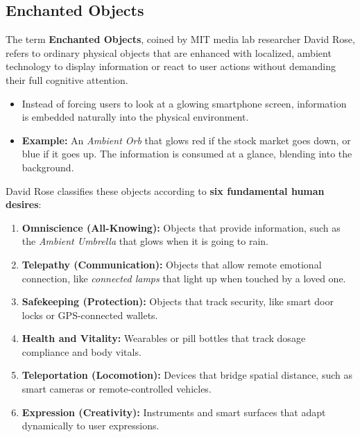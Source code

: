 \documentclass[12pt,a4paper]{article}
\begin{document}
\subsection{Enchanted Objects}
The term \textbf{Enchanted Objects}, coined by MIT media lab researcher David Rose, refers to ordinary physical objects that are enhanced with localized, ambient technology to display information or react to user actions without demanding their full cognitive attention.
\begin{itemize}[leftmargin=*, itemsep=2pt]
  \item Instead of forcing users to look at a glowing smartphone screen, information is embedded naturally into the physical environment.
  \item \textbf{Example:} An \textit{Ambient Orb} that glows red if the stock market goes down, or blue if it goes up. The information is consumed at a glance, blending into the background.
\end{itemize}

David Rose classifies these objects according to \textbf{six fundamental human desires}:
\begin{enumerate}[leftmargin=*, itemsep=2.5pt]
  \item \textbf{Omniscience (All-Knowing):} Objects that provide information, such as the \textit{Ambient Umbrella} that glows when it is going to rain.
  \item \textbf{Telepathy (Communication):} Objects that allow remote emotional connection, like \textit{connected lamps} that light up when touched by a loved one.
  \item \textbf{Safekeeping (Protection):} Objects that track security, like smart door locks or GPS-connected wallets.
  \item \textbf{Health and Vitality:} Wearables or pill bottles that track dosage compliance and body vitals.
  \item \textbf{Teleportation (Locomotion):} Devices that bridge spatial distance, such as smart cameras or remote-controlled vehicles.
  \item \textbf{Expression (Creativity):} Instruments and smart surfaces that adapt dynamically to user expressions.
\end{enumerate}
\end{document}
